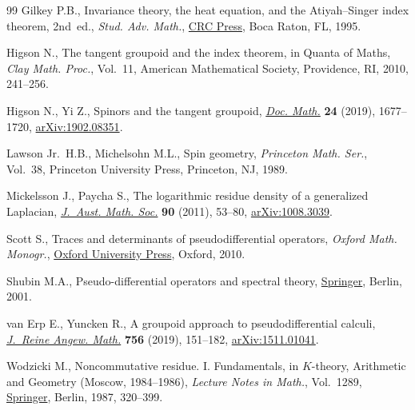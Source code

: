 \begin{thebibliography}{99}
Gilkey P.B., Invariance theory, the heat equation, and the {A}tiyah--{S}inger
 index theorem, 2nd~ed., \textit{Stud. Adv. Math.}, \href{https://doi.org/10.1201/9780203749791}{CRC Press}, Boca Raton, FL, 1995.

Higson N., The tangent groupoid and the index theorem, in Quanta of Maths,
 \textit{Clay Math. Proc.}, Vol.~11, American Mathematical Society,
 Providence, RI, 2010, 241--256.

Higson N., Yi Z., Spinors and the tangent groupoid, \href{https://doi.org/10.4171/DM/712}{\textit{Doc. Math.}}
 \textbf{24} (2019), 1677--1720, \href{https://arxiv.org/abs/1902.08351}{arXiv:1902.08351}.

Lawson Jr.~H.B., Michelsohn M.L., Spin geometry, \textit{Princeton Math. Ser.},
 Vol.~38, Princeton University Press, Princeton, NJ, 1989.

Mickelsson J., Paycha S., The logarithmic residue density of a generalized
 {L}aplacian, \href{https://doi.org/10.1017/S144678871100108X}{\textit{J.~Aust. Math. Soc.}} \textbf{90} (2011), 53--80,
 \href{https://arxiv.org/abs/1008.3039}{arXiv:1008.3039}.

Scott S., Traces and determinants of pseudodifferential operators, \textit{Oxford Math.
 Monogr.}, \href{https://doi.org/10.1093/acprof:oso/9780198568360.001.0001}{Oxford University Press}, Oxford, 2010.

Shubin M.A., Pseudo-differential operators and spectral theory, \href{https://doi.org/10.1007/978-3-642-56579-3}{Springer},
 Berlin, 2001.

van Erp E., Yuncken R., A groupoid approach to pseudodifferential calculi,
 \href{https://doi.org/10.1515/crelle-2017-0035}{\textit{J.~Reine Angew. Math.}} \textbf{756} (2019), 151--182,
 \href{https://arxiv.org/abs/1511.01041}{arXiv:1511.01041}.

Wodzicki M., Noncommutative residue. {I}. {F}undamentals, in {$K$}-theory,
 Arithmetic and Geometry ({M}oscow, 1984--1986), \textit{Lecture Notes in
 Math.}, Vol.~1289, \href{https://doi.org/10.1007/BFb0078372}{Springer}, Berlin, 1987, 320--399.

\end{thebibliography}\LastPageEnding
